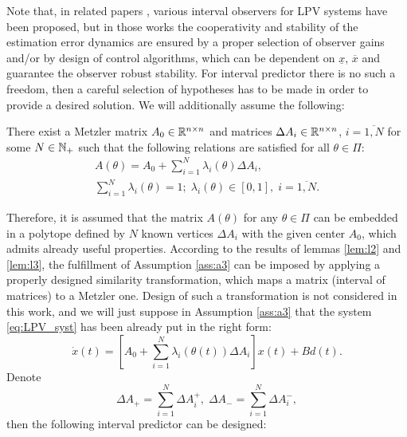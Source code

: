 Note that, in related papers \cite{AitRami2008,RVZ10,Bolajraf2011,Efimov_a2013,Efimov_tac2013,Chebotarev2015}, various interval observers for LPV systems have been proposed, but in those works the cooperativity and stability of the estimation error dynamics are ensured by a proper selection of observer gains and/or by design of control algorithms, which can be dependent on $\underline{x}$, $\overline{x}$ and guarantee the observer robust stability. For interval predictor there is no such a freedom, then a careful selection of hypotheses has to be made in order to provide a desired solution.
We will additionally assume the following:
\begin{assumption}
	\label{ass:a3} There exist a Metzler matrix $A_{0}\in\mathbb{R}^{n\times n}$ and matrices $\Delta A_{i}\in\mathbb{R}^{n\times n}$, $i=\overline{1,N}$ for some $N\in\mathbb{N}_{+}$ such that the following relations are satisfied for all $\theta\in\Pi$:
	\begin{gather*}
	A(\theta)=A_{0}+\sum_{i=1}^{N}\lambda_{i}(\theta)\Delta A_{i},\\
	\sum_{i=1}^{N}\lambda_{i}(\theta)=1;\;\lambda_{i}(\theta)\in[0,1],\;i=\overline{1,N}.
	\end{gather*}
\end{assumption}
Therefore, it is assumed that the matrix $A(\theta)$ for any $\theta\in\Pi$ can be embedded in a polytope defined by $N$ known vertices $\Delta A_{i}$ with the given center $A_{0}$, which admits already useful properties. According to the results of lemmas \ref{lem:l2} and \ref{lem:l3}, the fulfillment of Assumption \ref{ass:a3} can be imposed by applying a properly designed similarity transformation, which maps a matrix (interval of matrices) to a Metzler one. Design of such a transformation is not considered in this work, and we will just suppose in Assumption \ref{ass:a3} that the system \eqref{eq:LPV_syst} has been already put in the right form:
\[
\dot{x}(t)=[A_{0}+\sum_{i=1}^{N}\lambda_{i}(\theta(t))\Delta A_{i}]x(t)+Bd(t).
\]
Denote
\[
\Delta A_{+}=\sum_{i=1}^{N}\Delta A_{i}^{+},\;\Delta A_{-}=\sum_{i=1}^{N}\Delta A_{i}^{-},
\]
then the following interval predictor can be designed:
